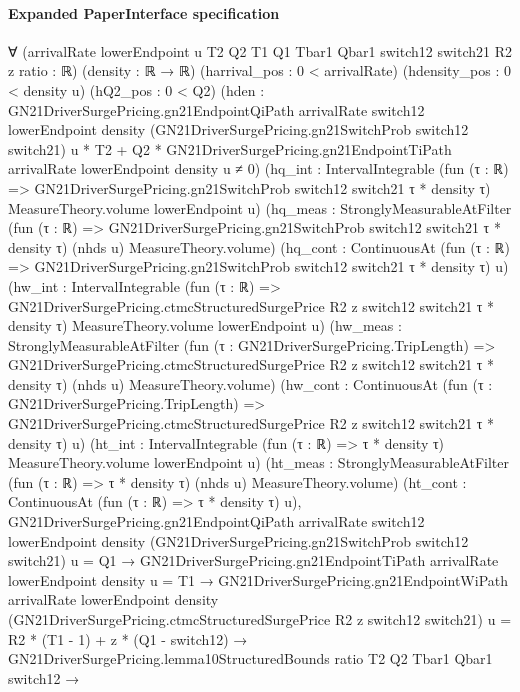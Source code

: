 \documentclass[10pt]{article}
\begin{document}
\paragraph{Expanded PaperInterface specification}
\begin{ReviewVerbatim}
∀ (arrivalRate lowerEndpoint u T2 Q2 T1 Q1 Tbar1 Qbar1 switch12 switch21 R2 z ratio : ℝ) (density : ℝ → ℝ)
  (harrival_pos : 0 < arrivalRate) (hdensity_pos : 0 < density u) (hQ2_pos : 0 < Q2)
  (hden :
    GN21DriverSurgePricing.gn21EndpointQiPath arrivalRate switch12 lowerEndpoint density
            (GN21DriverSurgePricing.gn21SwitchProb switch12 switch21) u *
          T2 +
        Q2 * GN21DriverSurgePricing.gn21EndpointTiPath arrivalRate lowerEndpoint density u ≠
      0)
  (hq_int :
    IntervalIntegrable (fun (τ : ℝ) => GN21DriverSurgePricing.gn21SwitchProb switch12 switch21 τ * density τ)
      MeasureTheory.volume lowerEndpoint u)
  (hq_meas :
    StronglyMeasurableAtFilter (fun (τ : ℝ) => GN21DriverSurgePricing.gn21SwitchProb switch12 switch21 τ * density τ)
      (nhds u) MeasureTheory.volume)
  (hq_cont : ContinuousAt (fun (τ : ℝ) => GN21DriverSurgePricing.gn21SwitchProb switch12 switch21 τ * density τ) u)
  (hw_int :
    IntervalIntegrable
      (fun (τ : ℝ) => GN21DriverSurgePricing.ctmcStructuredSurgePrice R2 z switch12 switch21 τ * density τ)
      MeasureTheory.volume lowerEndpoint u)
  (hw_meas :
    StronglyMeasurableAtFilter
      (fun (τ : GN21DriverSurgePricing.TripLength) =>
        GN21DriverSurgePricing.ctmcStructuredSurgePrice R2 z switch12 switch21 τ * density τ)
      (nhds u) MeasureTheory.volume)
  (hw_cont :
    ContinuousAt
      (fun (τ : GN21DriverSurgePricing.TripLength) =>
        GN21DriverSurgePricing.ctmcStructuredSurgePrice R2 z switch12 switch21 τ * density τ)
      u)
  (ht_int : IntervalIntegrable (fun (τ : ℝ) => τ * density τ) MeasureTheory.volume lowerEndpoint u)
  (ht_meas : StronglyMeasurableAtFilter (fun (τ : ℝ) => τ * density τ) (nhds u) MeasureTheory.volume)
  (ht_cont : ContinuousAt (fun (τ : ℝ) => τ * density τ) u),
  GN21DriverSurgePricing.gn21EndpointQiPath arrivalRate switch12 lowerEndpoint density
        (GN21DriverSurgePricing.gn21SwitchProb switch12 switch21) u =
      Q1 →
    GN21DriverSurgePricing.gn21EndpointTiPath arrivalRate lowerEndpoint density u = T1 →
      GN21DriverSurgePricing.gn21EndpointWiPath arrivalRate lowerEndpoint density
            (GN21DriverSurgePricing.ctmcStructuredSurgePrice R2 z switch12 switch21) u =
          R2 * (T1 - 1) + z * (Q1 - switch12) →
        GN21DriverSurgePricing.lemma10StructuredBounds ratio T2 Q2 Tbar1 Qbar1 switch12 →

\end{ReviewVerbatim}
\end{document}
